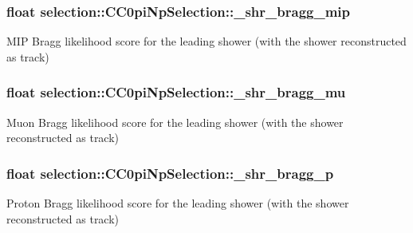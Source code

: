 \subsubsection[{\texorpdfstring{\+\_\+shr\+\_\+bragg\+\_\+mip}{_shr_bragg_mip}}]{\setlength{\rightskip}{0pt plus 5cm}float selection\+::\+C\+C0pi\+Np\+Selection\+::\+\_\+shr\+\_\+bragg\+\_\+mip\hspace{0.3cm}{\ttfamily [private]}}\hypertarget{classselection_1_1CC0piNpSelection_ae18587d33433c508bd3e371de8db7b32}{}\label{classselection_1_1CC0piNpSelection_ae18587d33433c508bd3e371de8db7b32}
M\+IP Bragg likelihood score for the leading shower (with the shower reconstructed as track) 
\subsubsection[{\texorpdfstring{\+\_\+shr\+\_\+bragg\+\_\+mu}{_shr_bragg_mu}}]{\setlength{\rightskip}{0pt plus 5cm}float selection\+::\+C\+C0pi\+Np\+Selection\+::\+\_\+shr\+\_\+bragg\+\_\+mu\hspace{0.3cm}{\ttfamily [private]}}\hypertarget{classselection_1_1CC0piNpSelection_a6ef67d022fce5058985773010161b7cb}{}\label{classselection_1_1CC0piNpSelection_a6ef67d022fce5058985773010161b7cb}
Muon Bragg likelihood score for the leading shower (with the shower reconstructed as track) 
\subsubsection[{\texorpdfstring{\+\_\+shr\+\_\+bragg\+\_\+p}{_shr_bragg_p}}]{\setlength{\rightskip}{0pt plus 5cm}float selection\+::\+C\+C0pi\+Np\+Selection\+::\+\_\+shr\+\_\+bragg\+\_\+p\hspace{0.3cm}{\ttfamily [private]}}\hypertarget{classselection_1_1CC0piNpSelection_acb447ca93f046abd1540291ba0d41e73}{}\label{classselection_1_1CC0piNpSelection_acb447ca93f046abd1540291ba0d41e73}
Proton Bragg likelihood score for the leading shower (with the shower reconstructed as track) 
